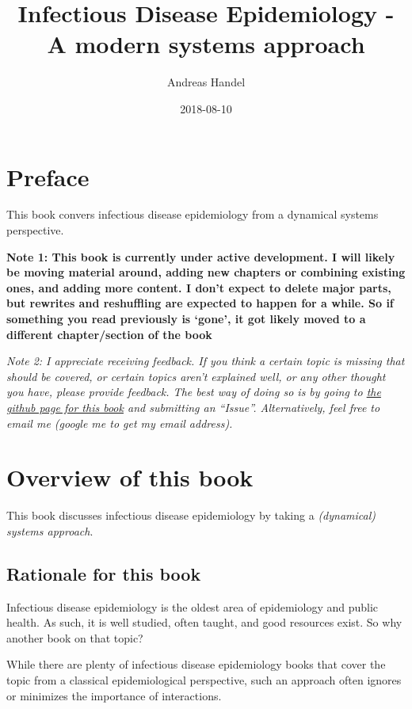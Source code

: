 \documentclass[]{book}
\title{Infectious Disease Epidemiology - A modern systems approach}
\author{Andreas Handel}
\date{2018-08-10}
\theoremstyle{definition}
\theoremstyle{definition}
\theoremstyle{definition}
\theoremstyle{remark}
\begin{document}
\maketitle

{
\setcounter{tocdepth}{1}
\tableofcontents
}
\hypertarget{preface}{%
\chapter*{Preface}\label{preface}}

This book convers infectious disease epidemiology from a dynamical
systems perspective.

\textbf{Note 1: This book is currently under active development. I will
likely be moving material around, adding new chapters or combining
existing ones, and adding more content. I don't expect to delete major
parts, but rewrites and reshuffling are expected to happen for a while.
So if something you read previously is `gone', it got likely moved to a
different chapter/section of the book}

\emph{Note 2: I appreciate receiving feedback. If you think a certain
topic is missing that should be covered, or certain topics aren't
explained well, or any other thought you have, please provide feedback.
The best way of doing so is by going to
\href{https://github.com/ahgroup/DSAIDEbook}{the github page for this
book} and submitting an ``Issue''. Alternatively, feel free to email me
(google me to get my email address).}

\hypertarget{overview-of-this-book}{%
\chapter{Overview of this book}\label{overview-of-this-book}}

This book discusses infectious disease epidemiology by taking a
\emph{(dynamical) systems approach}.

\hypertarget{rationale-for-this-book}{%
\section{Rationale for this book}\label{rationale-for-this-book}}

Infectious disease epidemiology is the oldest area of epidemiology and
public health. As such, it is well studied, often taught, and good
resources exist. So why another book on that topic?

While there are plenty of infectious disease epidemiology books that
cover the topic from a classical epidemiological perspective, such an
approach often ignores or minimizes the importance of interactions.
\end{document}
